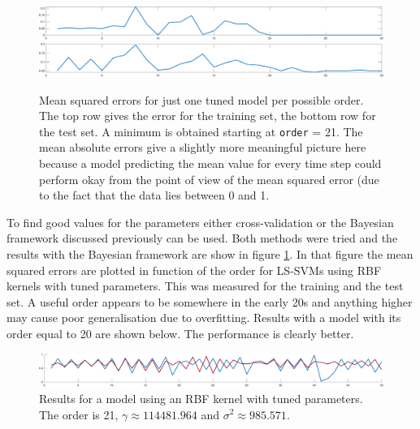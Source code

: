 \begin{figure}[!h]
\centering
\includegraphics[width=\textwidth]{../src/figures/logmap/mseval}\\
\includegraphics[width=\textwidth]{../src/figures/logmap/msetest}
\caption{Mean squared errors for just one tuned model per possible order. The top row gives the error for the training set, the bottom row for the test set. A minimum is obtained starting at \texttt{order} = 21. The mean absolute errors give a slightly more meaningful picture here because a model predicting the mean value for every time step could perform okay from the point of view of the mean squared error (due to the fact that the data lies between 0 and 1.}
\label{logmapord}
\end{figure}

To find good values for the parameters either cross-validation or the Bayesian framework discussed previously can be used. Both methods were tried and the results with the Bayesian framework are show in figure \ref{logmapord}. In that figure the mean squared errors are plotted in function of the order for LS-SVMs using RBF kernels with tuned parameters. This was measured for the training and the test set. A useful order appears to be somewhere in the early 20s and anything higher may cause poor generalisation due to overfitting. Results with a model with its order equal to 20 are shown below. The performance is clearly better.

\begin{figure}[!h]
\centering
\includegraphics[width=\textwidth]{../src/figures/logmap/final}
\caption{Results for a model using an RBF kernel with tuned parameters. The order is 21, $\gamma\approx 114481.964$ and $\sigma^2\approx 985.571$.}
\label{logmapfinal}
\end{figure}






